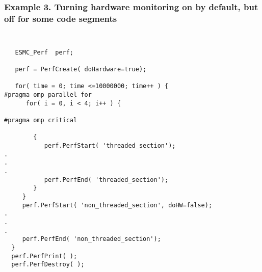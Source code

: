 \subsubsection{Example 3. Turning hardware monitoring on by default, but off 
for some code segments}
{\tt
\begin{verbatim}
   ESMC_Perf  perf;

   perf = PerfCreate( doHardware=true);

   for( time = 0; time <=10000000; time++ ) {
#pragma omp parallel for
      for( i = 0, i < 4; i++ ) {

#pragma omp critical

        {
           perf.PerfStart( 'threaded_section');
.
.
.
           perf.PerfEnd( 'threaded_section');
        }
     }
     perf.PerfStart( 'non_threaded_section', doHW=false);
.
.
.
     perf.PerfEnd( 'non_threaded_section');
  }
  perf.PerfPrint( );
  perf.PerfDestroy( );
\end{verbatim}
}
